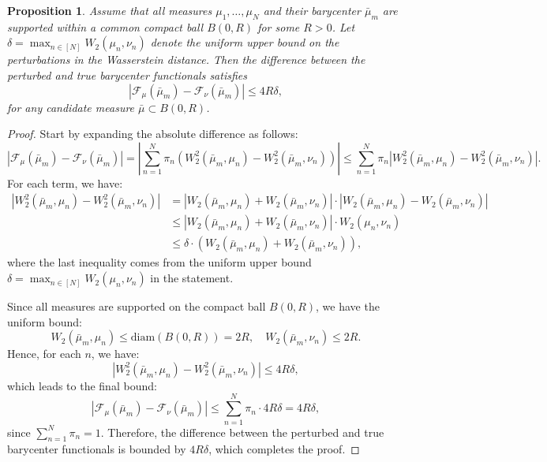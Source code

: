 \documentclass[11pt]{article}
\newtheorem{proposition}[theorem]{Proposition}
\begin{document}
\begin{proposition}\label{theory:stability_barycenter}
    Assume that all measures $\mu_1, \ldots, \mu_N$ and their barycenter $\bar{\mu}_m$ are supported within a common compact ball $B(0, R)$ for some $R > 0$. Let $\delta = \max_{n \in [N]} W_2(\mu_n, \nu_n)$ denote the uniform upper bound on the perturbations in the Wasserstein distance. Then the difference between the perturbed and true barycenter functionals satisfies
    \[
        |\mathcal{F}_\mu(\bar{\mu}_m) - \mathcal{F}_\nu(\bar{\mu}_m)| \leq 4R\delta,
    \]
    for any candidate measure $\bar{\mu} \subset B(0, R)$.
\end{proposition}
\begin{proof}
    Start by expanding the absolute difference as follows:
    \begin{equation*}
        |\mathcal{F}_\mu(\bar{\mu}_m) - \mathcal{F}_\nu(\bar{\mu}_m)| = \left|\sum_{n=1}^N \pi_n \left(W_2^2(\bar{\mu}_m, \mu_n) - W_2^2(\bar{\mu}_m, \nu_n)\right)\right| \leq \sum_{n=1}^N \pi_n |W_2^2(\bar{\mu}_m, \mu_n) - W_2^2(\bar{\mu}_m, \nu_n)|.
    \end{equation*}
    For each term, we have:
    \begin{align*}
        |W_2^2(\bar{\mu}_m, \mu_n) - W_2^2(\bar{\mu}_m, \nu_n)| &= |W_2(\bar{\mu}_m, \mu_n) + W_2(\bar{\mu}_m, \nu_n)| \cdot |W_2(\bar{\mu}_m, \mu_n) - W_2(\bar{\mu}_m, \nu_n)| \\
        &\leq |W_2(\bar{\mu}_m, \mu_n) + W_2(\bar{\mu}_m, \nu_n)| \cdot W_2(\mu_n, \nu_n) \\
        &\leq \delta \cdot \left(W_2(\bar{\mu}_m, \mu_n) + W_2(\bar{\mu}_m, \nu_n)\right),
    \end{align*}
    where the last inequality comes from the uniform upper bound \(\delta = \max_{n \in [N]} W_2(\mu_n, \nu_n)\) in the statement.

    Since all measures are supported on the compact ball \(B(0, R)\), we have the uniform bound:
    \[
    W_2(\bar{\mu}_m, \mu_n) \leq \text{diam}(B(0, R)) = 2R, \quad W_2(\bar{\mu}_m, \nu_n) \leq 2R.
    \]
    Hence, for each \(n\), we have:
    \[
    |W_2^2(\bar{\mu}_m, \mu_n) - W_2^2(\bar{\mu}_m, \nu_n)| \leq 4R\delta,
    \]
    which leads to the final bound:
    \[
    |\mathcal{F}_\mu(\bar{\mu}_m) - \mathcal{F}_\nu(\bar{\mu}_m)| \leq \sum_{n=1}^N \pi_n \cdot 4R\delta = 4R\delta,
    \]
    since \(\sum_{n=1}^N \pi_n = 1\).    Therefore, the difference between the perturbed and true barycenter functionals is bounded by \(4R\delta\), which completes the proof.
\end{proof}
\end{document}
